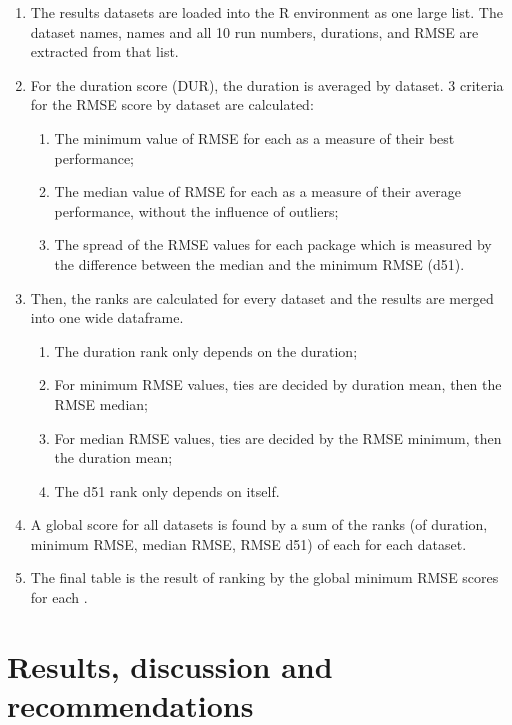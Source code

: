 \begin{enumerate}
\def\labelenumi{\arabic{enumi}.}
\tightlist
\item
  The results datasets are loaded into the \textsf{R} environment as one
  large list. The dataset names,  names and all
  10 run numbers, durations, and RMSE are extracted from that list.
\item
  For the duration score (DUR), the duration is averaged by dataset. 3
  criteria for the RMSE score by dataset are calculated:

  \begin{enumerate}
  \def\labelenumii{\alph{enumii}.}
  \tightlist
  \item
    The minimum value of RMSE for each  as a
    measure of their best performance;
  \item
    The median value of RMSE for each  as a
    measure of their average performance, without the influence of
    outliers;
  \item
    The spread of the RMSE values for each package which is measured by
    the difference between the median and the minimum RMSE (d51).
  \end{enumerate}
\item
  Then, the ranks are calculated for every dataset and the results are
  merged into one wide dataframe.

  \begin{enumerate}
  \def\labelenumii{\alph{enumii}.}
  \tightlist
  \item
    The duration rank only depends on the duration;
  \item
    For minimum RMSE values, ties are decided by duration mean, then the
    RMSE median;
  \item
    For median RMSE values, ties are decided by the RMSE minimum, then
    the duration mean;
  \item
    The d51 rank only depends on itself.
  \end{enumerate}
\item
  A global score for all datasets is found by a sum of the ranks (of
  duration, minimum RMSE, median RMSE, RMSE d51) of each
   for each dataset.
\item
  The final table is the result of ranking by the global minimum RMSE
  scores for each .
\end{enumerate}

\hypertarget{results-discussion-and-recommendations}{%
\section{Results, discussion and
recommendations}\label{results-discussion-and-recommendations}}

